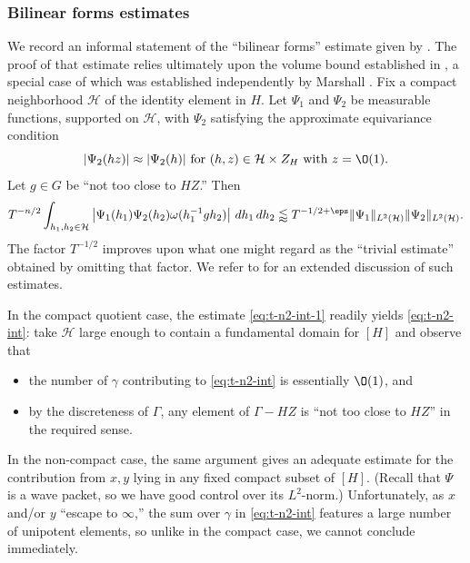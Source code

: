 \subsubsection{Bilinear forms estimates}
We record an informal statement of the ``bilinear forms'' estimate given by \cite[Thm 15.1]{2020arXiv201202187N}.  The proof of that estimate relies ultimately upon the volume bound established in \cite[\S16--17]{2020arXiv201202187N}, a special case of which was established independently by Marshall \cite[Prop 6.2]{2023arXiv2309.16667}.  Fix a compact neighborhood $\mathcal{H}$ of the identity element in $H$.  Let $\Psi_1$ and $\Psi_2$ be measurable functions, supported on $\mathcal{H}$, with $\Psi_2$ satisfying the approximate equivariance condition
\begin{equation*}
  |\Psi_2(h z)| \approx |\Psi_2(h)| \text{ for } (h,z) \in \mathcal{H} \times Z_H  \text{ with } z = \O(1).
\end{equation*}
Let $g \in G$ be ``not too close to $H Z$.''  Then
\begin{equation}\label{eq:t-n2-int-1}
  T^{-n/2} \int_{h_1, h_2 \in \mathcal{H} }
  \left\lvert
    \Psi_1(h_1) \Psi_2(h_2)
    \omega(h_1^{-1} g h_2) \right\rvert \, d h_1 \, d h_2
  \lessapprox
  T^{-1/2 + \eps}
  \|\Psi_1\|_{L^2(\mathcal{H})}
  \|\Psi_2\|_{L^2(\mathcal{H})}.
\end{equation}
The factor $T^{-1/2}$ improves upon what one might regard as the ``trivial estimate'' obtained by omitting that factor.  We refer to \cite[\S1.5.3--1.5.7, \S2.9--2.11]{2020arXiv201202187N} for an extended discussion of such estimates.

In the compact quotient case, the estimate \eqref{eq:t-n2-int-1} readily yields \eqref{eq:t-n2-int}: take $\mathcal{H}$ large enough to contain a fundamental domain for $[H]$ and observe that
\begin{itemize}
\item the number of $\gamma$ contributing to \eqref{eq:t-n2-int} is essentially $\O(1)$, and
\item by the discreteness of $\Gamma$, any element of $\Gamma - H Z$ is ``not too close to $H Z$'' in the required sense.
\end{itemize}

In the non-compact case, the same argument gives an adequate estimate for the contribution from $x, y$ lying in any fixed compact subset of $[H]$.  (Recall that $\Psi$ is a wave packet, so we have good control over its $L^2$-norm.)  Unfortunately, as $x$ and/or $y$ ``escape to $\infty$,'' the sum over $\gamma$ in \eqref{eq:t-n2-int} features a large number of unipotent elements, so unlike in the compact case, we cannot conclude immediately.

